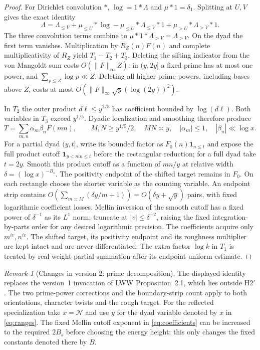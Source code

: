 \documentclass[11pt]{article}
\theoremstyle{definition}
\newcommand{\ind}{\mathbf 1}
\newcommand{\GN}{\mathcal N}
\theoremstyle{remark}
\newtheorem{remark}[theorem]{Remark}
\numberwithin{equation}{section}
\begin{document}
\begin{proof}
For Dirichlet convolution $*$, $\log=1*\Lambda$ and
$\mu*1=\delta_1$. Splitting at $U,V$ gives the exact identity
\begin{equation}\label{eq:vaughan-convolution}
 \Lambda=\Lambda_{\le V}+\mu_{\le U}*\log
    -\mu_{\le U}*\Lambda_{\le V}*1
    +\mu_{>U}*\Lambda_{>V}*1.
\end{equation}
The three convolution terms combine to
$\mu*1*\Lambda_{>V}=\Lambda_{>V}$.
On the dyad the first term vanishes. Multiplication by $R_Z(n)F(n)$
and complete multiplicativity of $R_Z$ yield $T_1-T_2+T_3$.
Deleting the sifting indicator from the von Mangoldt sum costs
$O(\|F\|_\infty Z)$: in $(y,2y]$ a fixed prime has at most one
power, and $\sum_{p\le Z}\log p\ll Z$. Deleting all higher
prime powers, including bases above $Z$, costs at most
$O(\|F\|_\infty\sqrt y(\log(2y))^2)$.

In $T_2$ the outer product $d\ell\le y^{2/5}$ has coefficient
bounded by $\log(d\ell)$. Both variables in $T_3$ exceed
$y^{1/5}$. Dyadic localization and smoothing therefore produce
\begin{equation}\label{eq:Trect}
 T=\sum_{m,n}\alpha_m\beta_n F(mn),\qquad
 M,N\ge y^{1/5}/2,\quad MN\asymp y,
 \quad |\alpha_m|\le1,\quad|\beta_n|\ll\log x.
\end{equation}
For a partial dyad $(y,t]$, write its bounded factor as
$F_0(n)\ind_{n\le t}$ and expose the full product cutoff
$\ind_{y<mn\le t}$ before the rectangular reduction; for a full
dyad take $t=2y$. Smooth this product cutoff as a function of $mn/y$
at relative width $\delta=(\log x)^{-B_s}$. The positivity endpoint
of the shifted target remains in $F_0$. On each rectangle choose
the shorter variable as the counting variable. An endpoint strip contains
$O(\sum_{m\asymp M}(\delta y/m+1))
 =O(\delta y+\sqrt y)$ pairs, with fixed logarithmic coefficient
losses. Mellin inversion of the smooth cutoff has a fixed power
of $\delta^{-1}$ as its $L^1$ norm; truncate at
$|v|\le\delta^{-2}$, raising the fixed integration-by-parts order
for any desired logarithmic precision. The coefficients acquire
only $m^{iv},n^{iv}$. The shifted target, its positivity endpoint
and its roughness multiplier are kept intact and are never
differentiated. The extra factor $\log k$ in $T_1$ is treated by
real-weight partial summation after its endpoint-uniform estimate.
\end{proof}
\begin{remark}[Changes in version 2: prime decomposition]
The displayed identity replaces the version~1 invocation of LWW
Proposition~2.1, which lies outside $\mathrm H2'$. The two
prime-power corrections and the boundary-strip count apply to
both orientations, character twists and the rough target.
For the reflected specialization take $x=\GN$ and use $y$ for
the dyad variable denoted by $x$ in \eqref{eq:ranges}.
The fixed Mellin cutoff exponent in \eqref{eq:coefficients} can
be increased to the required $2B_s$ before choosing the energy
height; this only changes the fixed constants denoted there by $B$.
\end{remark}
\end{document}
